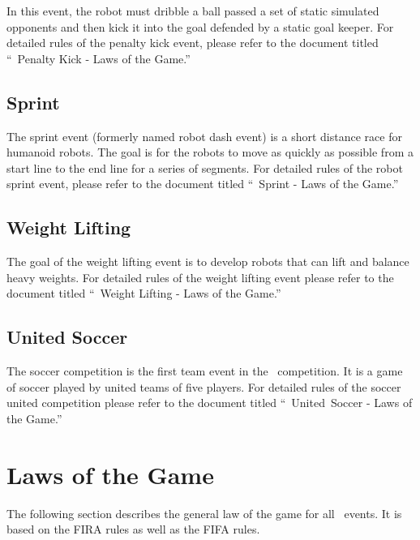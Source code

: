 \documentclass[12pt]{hurocup}
\begin{document}
In this event, the robot must dribble a ball passed a set of static
simulated opponents and then kick it into the goal defended by a
static goal keeper. For detailed rules of the penalty kick event,
please refer to the document titled ``\HuroCup\ Penalty Kick - Laws of
the Game.''

\subsection{Sprint}
\label{subsec:sprint}

The sprint event (formerly named robot dash event) is a short distance
race for humanoid robots. The goal is for the robots to move as
quickly as possible from a start line to the end line for a series of
segments. For detailed rules of the robot sprint event, please refer to
the document titled ``\HuroCup\ Sprint - Laws of the Game.''

\subsection{Weight Lifting}
\label{subsec:weight-lifting}

The goal of the weight lifting event is to develop robots that can
lift and balance heavy weights. For detailed rules of the weight
lifting event please refer to the document titled ``\HuroCup\ Weight
Lifting - Laws of the Game.''

\subsection{United Soccer}
\label{subsec:united_soccer}

The soccer competition is the first team event in the
\HuroCup\ competition. It is a game of soccer played by united teams
of five players. For detailed rules of the soccer united competition
please refer to the document titled ``\HuroCup\ United\ Soccer - Laws
of the Game.''

\section{Laws of the Game}
\label{sec:laws}

The following section describes the general law of the game for all
\HuroCup\  events. It is based on the FIRA rules as well as the FIFA
rules. 

\label{law:players}
\end{document}

